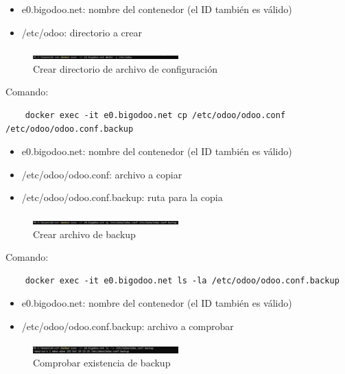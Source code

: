 \documentclass[a4paper,12pt]{article}
\begin{document}
\begin{itemize}
    \item e0.bigodoo.net: nombre del contenedor (el ID también es válido)
    \item /etc/odoo: directorio a crear
\end{itemize}

\begin{figure}[h!]
    \centering
    \includegraphics[width=0.5\textwidth]{pr2odoo82-crearDirectorio.png}
    \caption{Crear directorio de archivo de configuración}
\end{figure}
\FloatBarrier

Comando: 
\begin{verbatim}
    docker exec -it e0.bigodoo.net cp /etc/odoo/odoo.conf /etc/odoo/odoo.conf.backup
\end{verbatim}

\begin{itemize}
    \item e0.bigodoo.net: nombre del contenedor (el ID también es válido)
    \item /etc/odoo/odoo.conf: archivo a copiar
    \item /etc/odoo/odoo.conf.backup: ruta para la copia
\end{itemize}

\begin{figure}[h!]
    \centering
    \includegraphics[width=0.5\textwidth]{pr2odoo83-crearBackup.png}
    \caption{Crear archivo de backup}
\end{figure}
\FloatBarrier

Comando: 
\begin{verbatim}
    docker exec -it e0.bigodoo.net ls -la /etc/odoo/odoo.conf.backup
\end{verbatim}

\begin{itemize}
    \item e0.bigodoo.net: nombre del contenedor (el ID también es válido)
    \item /etc/odoo/odoo.conf.backup: archivo a comprobar
\end{itemize}

\begin{figure}[h!]
    \centering
    \includegraphics[width=0.5\textwidth]{pr2odoo84-comprobarBackup.png}
    \caption{Comprobar existencia de backup}
\end{figure}
\FloatBarrier
\end{document}
